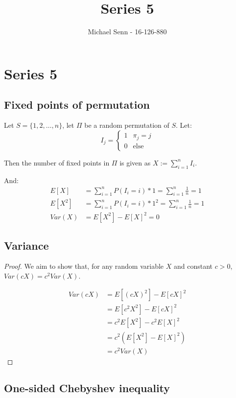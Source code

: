 \documentclass[a4paper]{scrreprt}
\title{Series 5}
\author{Michael Senn \maillink{michael.senn@students.unibe.ch} - 16-126-880}
\date{\printdate}
\begin{document}
\maketitle


\setcounter{chapter}{4}
\chapter{Series 5}

\section{Fixed points of permutation}

Let $S = \{1, 2, \ldots, n\}$, let $\Pi$ be a random permutation of $S$.
Let:
\[
	I_{j} =
	\begin{cases}
		1 & \pi_j = j \\
		0 & \text{else}
	\end{cases}
\]

Then the number of fixed points in $\Pi$ is given as $X := \sum_{i=1}^n{I_i}$.

And:
\begin{align*}
	E[X] & = \sum_{i=1}^n{P(I_i = i) * 1} = \sum_{i=1}^n{\frac{1}{n}} = 1 \\
	E[X^2] & = \sum_{i=1}^n{P(I_i = i) * 1^2} = \sum_{i=1}^n{\frac{1}{n}} = 1 \\
	Var(X) & = E[X^2] - E[X]^2 = 0
\end{align*}

\section{Variance}

\begin{proof}
	We aim to show that, for any random variable $X$ and constant $c > 0$,
	$Var(cX) = c^2 Var(X)$.

	\begin{align*}
		Var(cX) & = E[(cX)^2] - E[cX]^2 \\
			& = E[c^2 X^2] - E[cX]^2 \\
			& = c^2 E[X^2] - c^2 E[X]^2 \\
			& = c^2 (E[X^2] - E[X]^2) \\
			& = c^2 Var(X)
	\end{align*}
\end{proof}

\section{One-sided Chebyshev inequality}
\end{document}
